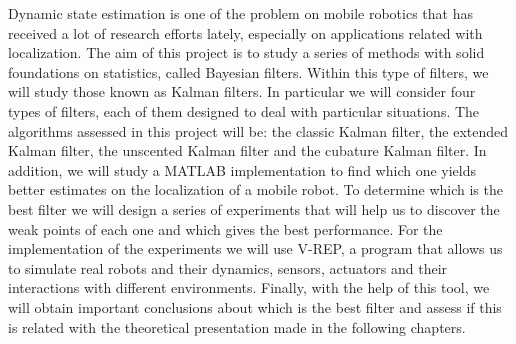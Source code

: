 
\cleardoublepage
\thispagestyle{empty}

Dynamic state estimation is one of the problem on mobile robotics that has received a lot of research efforts lately, especially on applications related with localization.
The aim of this project is to study a series of methods with solid foundations on statistics, called Bayesian filters.
Within this type of filters, we will study those known as Kalman filters.
In particular we will consider four types of filters, each of them designed to deal with particular situations.
The algorithms assessed in this project will be: the classic Kalman filter, the extended Kalman filter, the unscented Kalman filter and the cubature Kalman filter.
In addition, we will study a MATLAB implementation to find which one yields better estimates on the localization of a mobile robot.
To determine which is the best filter we will design a series of experiments that will help us to discover the weak points of each one and which gives the best performance.
For the implementation of the experiments we will use V-REP, a program that allows us to simulate real robots and their dynamics, sensors, actuators and their interactions with different environments.
Finally, with the help of this tool, we will obtain important conclusions about which is the best filter and assess if this is related with the theoretical presentation made in the following chapters.